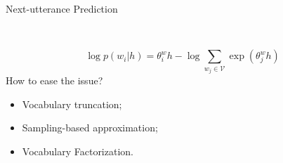 \documentclass[english]{beamer} %
\begin{document}
\begin{frame}[<+->]{Next-utterance Prediction}

\begin{figure}
\centering
{}
~
\end{figure}

\begin{equation}
\log p(w_i|h) = \theta^w_i h-\log \sum_{w_j\in \mathcal{V}}{\exp(\theta^w_j h)}
\end{equation}
{How to ease the issue?}
\begin{itemize}
  \item Vocabulary truncation;
  \item Sampling-based approximation;
  \item Vocabulary Factorization.
\end{itemize}
\end{frame}
\end{document}
